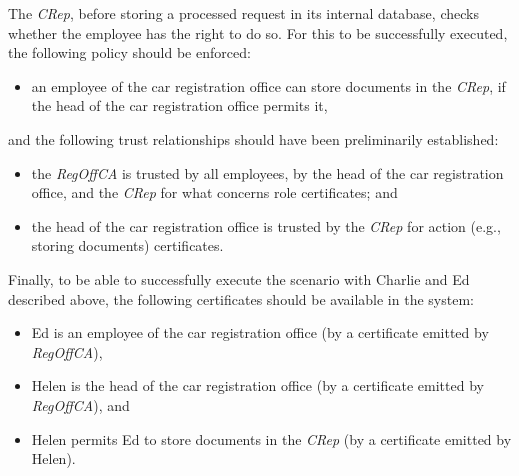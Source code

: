 \documentclass[conference]{IEEEtran}
\begin{document}
\begin{LONG}
The \emph{CRep}, before storing a processed request in its
internal database, checks whether the employee has the right to do
so. For this to be successfully executed, the following policy should
be enforced:
\begin{itemize}
\item an employee of the car registration office can store documents
  in the \emph{CRep}, if the head of the car registration
  office permits it,
\end{itemize}
and the following trust relationships should have been preliminarily
established:
\begin{itemize}
\item the \emph{RegOffCA} 
is trusted by all employees, by the head of the car registration
  office, and the \emph{CRep} for what concerns role certificates; and
\item the head of the car registration office is trusted by the
  \emph{CRep} for action (e.g., storing documents) certificates.
\end{itemize}
Finally, to be able to successfully execute the scenario with Charlie and
Ed described above, the following certificates should be available
in the system:
\begin{itemize}
\item Ed is an employee of the car registration office (by a
  certificate emitted by \emph{RegOffCA}),
\item Helen is the head of the car registration office (by a
  certificate emitted by \emph{RegOffCA}), and 
\item Helen permits Ed to store documents in the \emph{CRep} (by a certificate emitted by Helen).
\end{itemize}


\end{LONG}
\end{document}
